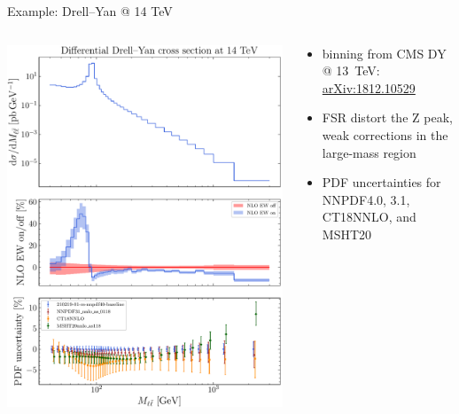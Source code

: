 \begin{frame}{Example: Drell--Yan @ 14 TeV}
\fontsize{9}{11}\selectfont
\begin{columns}[T,onlytextwidth]
\begin{column}{0.5\textwidth}
\includegraphics[height=.89\textheight]{ew_corrections/figures/NNPDF40_DY_Z}
\end{column}
\begin{column}{0.5\textwidth}
\begin{itemize}
\vspace*{0.1cm}
\item binning from CMS DY @ \SI{13}{\tera\electronvolt}: \href{https://arxiv.org/abs/1812.10529}{arXiv:1812.10529}
\vspace*{2.2cm}
\item FSR distort the Z peak, weak corrections in the large-mass region
\vspace*{1.25cm}
\item PDF uncertainties for NNPDF4.0, 3.1, CT18NNLO, and MSHT20
\end{itemize}
\end{column}
\end{columns}
\end{frame}
